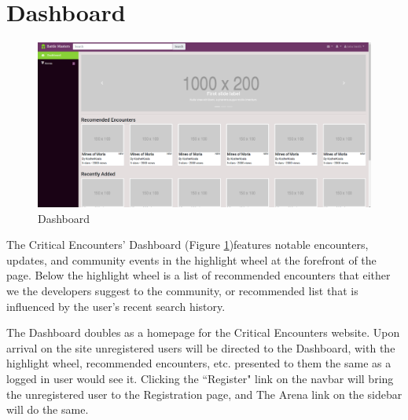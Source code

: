 \documentclass[12pt,a4paper]{report}
\begin{document}
	\section{Dashboard}
	\begin{figure}[H]
		\centering
		\includegraphics[scale=.20]{home}
		\caption{Dashboard}
		\label{fig: Dashboard}
	\end{figure}
	The Critical Encounters' Dashboard (Figure \ref{fig: Dashboard})features notable encounters, updates, and community events in the highlight wheel at the forefront of the page. Below the highlight wheel is a list of recommended encounters that either we the developers suggest to the community, or recommended list that is influenced by the user's recent search history.\par
	The Dashboard doubles as a homepage for the Critical Encounters website. Upon arrival on the site unregistered users will be directed to the Dashboard, with the highlight wheel, recommended encounters, etc. presented to them the same as a logged in user would see it. Clicking the ``Register" link on the navbar will bring the unregistered user to the Registration page, and The Arena link on the sidebar will do the same. 
	\newpage
\end{document}
